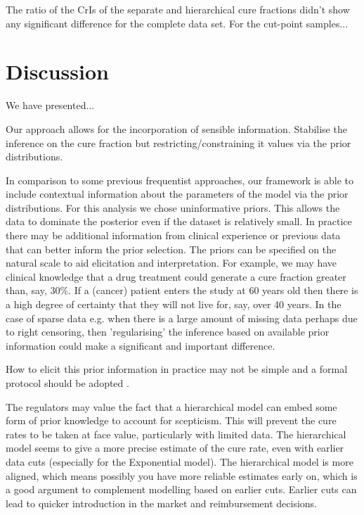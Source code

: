 \documentclass[AMA,STIX1COL]{WileyNJD-v2}
\begin{document}
The ratio of the CrIs of the separate and hierarchical cure fractions didn't show any significant difference for the complete data set.
For the cut-point samples...




\section{Discussion}\label{sec:discussion}
We have presented...

Our approach allows for the incorporation of sensible information.
Stabilise the inference on the cure fraction but restricting/constraining it values via the prior distributions.

In comparison to some previous frequentist approaches, our framework is able to include contextual information about the parameters of the model via the prior distributions.
For this analysis we chose uninformative priors.
This allows the data to dominate the posterior even if the dataset is relatively small.
In practice there may be additional information from clinical experience or previous data that can better inform the prior selection.
The priors can be specified on the natural scale to aid elicitation and interpretation.
For example, we may have clinical knowledge that a drug treatment could generate a cure fraction greater than, say, 30\%.
If a (cancer) patient enters the study at 60 years old then there is a high degree of certainty that they will not live for, say, over 40 years.
In the case of sparse data e.g. when there is a large amount of missing data perhaps due to right censoring, then 'regularising' the inference based on available prior information could make a significant and important difference.

How to elicit this prior information in practice may not be simple and a formal protocol should be adopted \cite{OHagan2019}.


The regulators may value the fact that a hierarchical model can embed some form of prior knowledge to account for scepticism.
This will prevent the cure rates to be taken at face value, particularly with limited data.
The hierarchical model seems to give a more precise estimate of the cure rate, even with earlier data cuts (especially for the Exponential model).
The hierarchical model is more aligned, which means possibly you have more reliable estimates early on, which is a good argument to complement modelling based on earlier cuts.
Earlier cuts can lead to quicker introduction in the market and reimbursement decisions.
\end{document}
